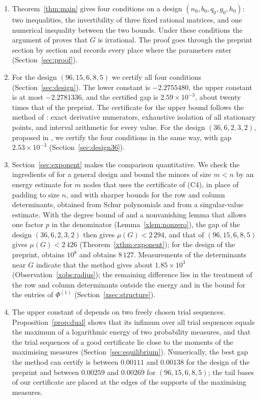 \documentclass[11pt]{article}
\theoremstyle{definition}
\begin{document}
\begin{enumerate}
\item Theorem~\ref{thm:main} gives four conditions on a design $(n_0,b_0,q_0,g_0,h_0)$: two inequalities, the invertibility of three fixed rational matrices, and one numerical inequality between the two bounds. Under these conditions the argument of \cite{OAI} proves that $G$ is irrational. The proof goes through the preprint section by section and records every place where the parameters enter (Section~\ref{sec:proof}).
\item For the design $(96,15,6,8,5)$ we certify all four conditions (Section~\ref{sec:design}). The lower constant is $-2.2755480$, the upper constant is at most $-2.2781336$, and the certified gap is $2.59\times10^{-3}$, about twenty times that of the preprint. The certificate for the upper bound follows the method of \cite[Sec.~7]{OAI}: exact derivative numerators, exhaustive isolation of all stationary points, and interval arithmetic for every value. For the design $(36,6,2,3,2)$, proposed in \cite{Bojnal}, we certify the four conditions in the same way, with gap $2.53\times10^{-3}$ (Section~\ref{sec:design36}).
\item Section~\ref{sec:exponent} makes the comparison quantitative. We check the ingredients of \cite{Jha} for a general design and bound the minors of size $m<n$ by an energy estimate for $m$ nodes that uses the certificate of (C4), in place of padding to size $n$, and with sharper bounds for the row and column determinants, obtained from Schur polynomials and from a singular-value estimate. With the degree bound of \cite{Litsey} and a nonvanishing lemma that allows one factor $p$ in the denominator (Lemma~\ref{xlem:nonzero}), the gap of the design $(36,6,2,3,2)$ then gives $\mu(G)<2\,294$, and that of $(96,15,6,8,5)$ gives $\mu(G)<2\,426$ (Theorem~\ref{xthm:exponent}); for the design of the preprint, \cite{Jha} obtains $10^8$ and \cite{Litsey} obtains $8\,127$. Measurements of the determinants near $G$ indicate that the method gives about $1.85\times10^3$ (Observation~\ref{xobs:radius}); the remaining difference lies in the treatment of the row and column determinants outside the energy and in the bound for the entries of $\Phi^{(1)}$ (Section~\ref{xsec:structure}).
\item The upper constant of \cite[Prop.~6.1]{OAI} depends on two freely chosen trial sequences. Proposition~\ref{prop:dual} shows that its infimum over all trial sequences equals the maximum of a logarithmic energy of two probability measures, and that the trial sequences of a good certificate lie close to the moments of the maximising measures (Section~\ref{sec:equilibrium}). Numerically, the best gap the method can certify is between $0.00111$ and $0.00138$ for the design of the preprint and between $0.00259$ and $0.00269$ for $(96,15,6,8,5)$; the tail bases of our certificate are placed at the edges of the supports of the maximising measures.

\end{enumerate}
\end{document}
